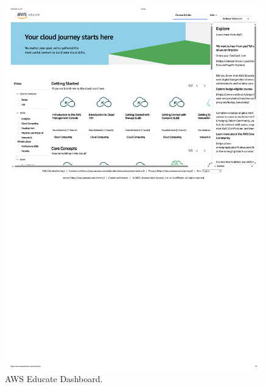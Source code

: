 \documentclass[a4paper]{article}
\begin{document}
    \begin{figure}[!htp]
        \centering
        \includegraphics[width=\textwidth]{img/AWS Educate Dashboard.pdf}
        \caption{AWS Educate Dashboard.}
    \end{figure}\newpage
\end{document}

